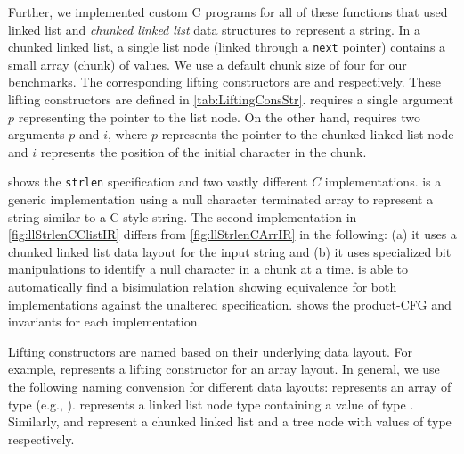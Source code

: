 Further, we implemented
custom C programs for all of these functions that used
linked list
and {\em chunked linked list} data structures
to represent a string.
In a chunked linked list, a single list node (linked
through a {\tt next} pointer)
contains a small array (chunk) of values.
We use a default chunk size of four for our
benchmarks.
The corresponding lifting constructors are 
and  respectively.
These lifting constructors are defined in \cref{tab:LiftingConsStr}.
 requires a single
argument $p$ representing the pointer to the list node.
On the other hand,  requires two arguments $p$
and $i$, where $p$ represents the pointer to the chunked linked list node
and $i$ represents the position of the initial character in the chunk.

 shows the {\tt strlen} specification and two vastly
different $C$ implementations.  is a generic implementation
using a null character terminated array to represent a string similar to a C-style string.
The second implementation in \cref{fig:llStrlenCClistIR} differs from \cref{fig:llStrlenCArrIR}
in the following: (a) it uses a chunked linked list data layout for the input string
and (b) it uses specialized bit manipulations to identify a null character in a chunk at a time.
\toolName{} is able to automatically find a bisimulation relation showing equivalence
for both implementations against the unaltered specification.
 shows the product-CFG and invariants for each implementation.



Lifting constructors are named based on their underlying data layout.
For example,  represents a  lifting constructor
for an array layout.
In general, we use the following naming convension for different data layouts:
 represents an array of type  (e.g., ).
 represents a linked list node type containing a value of type .
Similarly,  and  represent a chunked linked list and a tree node
with values of type  respectively.


\vspace{-15px}
